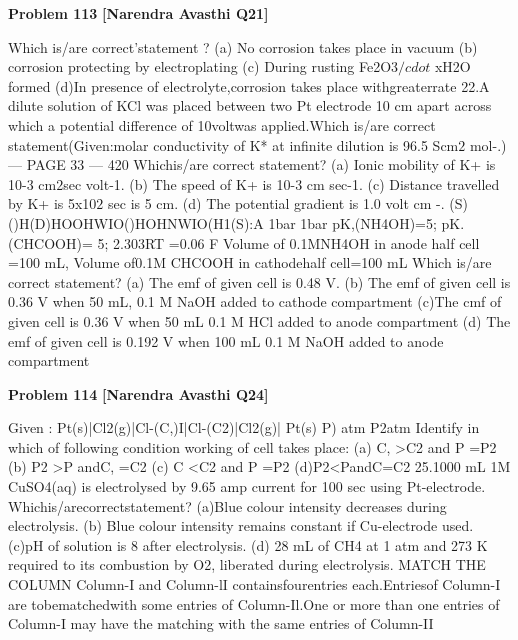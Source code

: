 \begin{problembox}
\textbf{Problem 113} \hfill \textbf{[Narendra Avasthi Q21]}
\label{q:ext-narendra_avasthi_all_questions-113}

Which is/are correct'statement ?
(a) No corrosion takes place in vacuum
(b) corrosion protecting by electroplating
(c) During rusting Fe2O3$/cdot$ xH2O formed
(d)In presence of electrolyte,corrosion takes place withgreaterrate
22.A dilute solution of KCl was placed between two Pt electrode 10 cm apart across which a
potential difference of 10voltwas applied.Which is/are correct statement(Given:molar
conductivity of K* at infinite dilution is 96.5 Scm$2$ mol-.)
--- PAGE 33 ---
420
Whichis/are correct statement?
(a) Ionic mobility of K+ is 10-3 cm$2$sec volt-1.
(b) The speed of K+ is 10-3 cm sec-1.
(c) Distance travelled by K+ is 5x10$2$ sec is 5 cm.
(d) The potential gradient is 1.0 volt cm -.
(S)()H(D)HOOHWIO()HOHNWIO(H1(S):A
1bar
1bar
pK,(NH4OH)=5; pK. (CHCOOH)= 5;
2.303RT
=0.06
F
Volume of 0.1MNH4OH in anode half cell =100 mL,
Volume of0.1M CHCOOH in cathodehalf cell=100 mL
Which is/are correct statement?
(a) The emf of given cell is 0.48 V.
(b) The emf of given cell is 0.36 V when 50 mL, 0.1 M NaOH added to cathode compartment
(c)The cmf of given cell is 0.36 V when 50 mL 0.1 M HCl added to anode compartment
(d) The emf of given cell is 0.192 V when 100 mL 0.1 M NaOH added to anode compartment
\end{problembox}

\begin{problembox}
\textbf{Problem 114} \hfill \textbf{[Narendra Avasthi Q24]}
\label{q:ext-narendra_avasthi_all_questions-114}

Given : Pt(s)|Cl2(g)|Cl-(C,)I|Cl-(C2)|Cl2(g)| Pt(s)
P) atm
P2atm
Identify in which of following condition working of cell takes place:
(a) C, >C2 and P =P2
(b) P2 >P andC, =C2
(c) C <C2 and P =P2
(d)P2<PandC=C2
25.1000 mL 1M CuSO4(aq) is electrolysed by 9.65 amp current for 100 sec using Pt-electrode.
Whichis/arecorrectstatement?
(a)Blue colour intensity decreases during electrolysis.
(b) Blue colour intensity remains constant if Cu-electrode used.
(c)pH of solution is 8 after electrolysis.
(d) 28 mL of CH4 at 1 atm and 273 K required to its combustion by O2, liberated during
electrolysis.
MATCH THE COLUMN
Column-I and Column-lI containsfourentries each.Entriesof Column-I are tobematchedwith
some entries of Column-Il.One or more than one entries of Column-I may have the matching with
the same entries of Column-II
\end{problembox}

